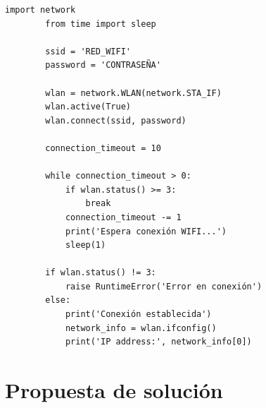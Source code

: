 \documentclass[letterpaper,12pt]{article}
\begin{document}
    \begin{lstlisting}[basicstyle=\ttfamily\footnotesize,caption={Figura 12-3. Codigo de ejemplo; actividad 2}]
        import network 
        from time import sleep 

        ssid = 'RED_WIFI'       
        password = 'CONTRASEÑA'  

        wlan = network.WLAN(network.STA_IF) 
        wlan.active(True) 
        wlan.connect(ssid, password) 

        connection_timeout = 10 

        while connection_timeout > 0: 
            if wlan.status() >= 3: 
                break 
            connection_timeout -= 1 
            print('Espera conexión WIFI...') 
            sleep(1) 

        if wlan.status() != 3: 
            raise RuntimeError('Error en conexión') 
        else: 
            print('Conexión establecida') 
            network_info = wlan.ifconfig() 
            print('IP address:', network_info[0]) 
    \end{lstlisting}

    \section*{Propuesta de solución}
\end{document}
